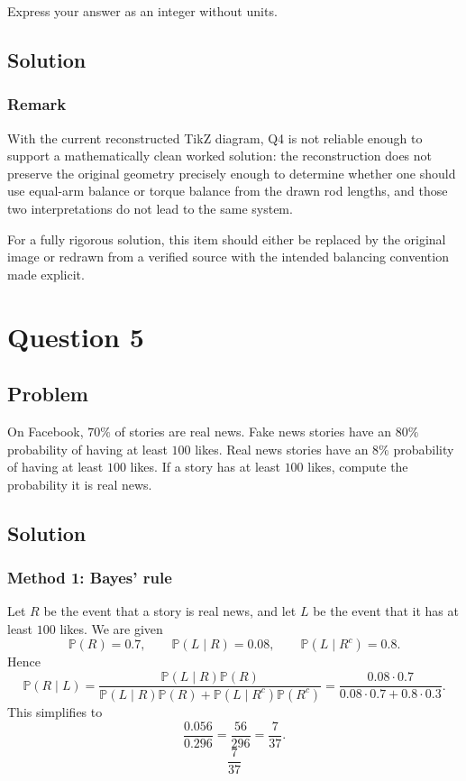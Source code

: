 \documentclass[12pt]{article}
\begin{document}
Express your answer as an integer without units.

\subsection{Solution}
\subsubsection{Remark}
With the current reconstructed TikZ diagram, Q4 is not reliable enough to support a mathematically clean worked solution: the reconstruction does not preserve the original geometry precisely enough to determine whether one should use equal-arm balance or torque balance from the drawn rod lengths, and those two interpretations do not lead to the same system.

For a fully rigorous solution, this item should either be replaced by the original image or redrawn from a verified source with the intended balancing convention made explicit.

\newpage
\section{Question 5}
\subsection{Problem}
On Facebook, $70\%$ of stories are real news. Fake news stories have an $80\%$ probability of having at least $100$ likes. Real news stories have an $8\%$ probability of having at least $100$ likes. If a story has at least $100$ likes, compute the probability it is real news.

\subsection{Solution}
\subsubsection{Method 1: Bayes' rule}
Let $R$ be the event that a story is real news, and let $L$ be the event that it has at least $100$ likes.
We are given
\[
\mathbb{P}(R)=0.7,
\qquad
\mathbb{P}(L\mid R)=0.08,
\qquad
\mathbb{P}(L\mid R^c)=0.8.
\]
Hence
\[
\mathbb{P}(R\mid L)
=
\frac{\mathbb{P}(L\mid R)\mathbb{P}(R)}{\mathbb{P}(L\mid R)\mathbb{P}(R)+\mathbb{P}(L\mid R^c)\mathbb{P}(R^c)}
=
\frac{0.08\cdot 0.7}{0.08\cdot 0.7 + 0.8\cdot 0.3}.
\]
This simplifies to
\[
\frac{0.056}{0.296} = \frac{56}{296} = \frac{7}{37}.
\]
\[
\boxed{\frac{7}{37}}
\]
\end{document}
